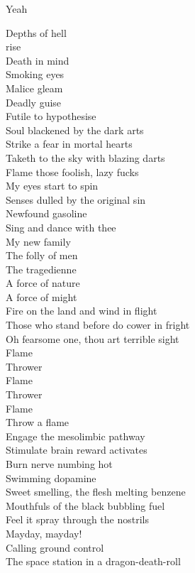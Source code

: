 Yeah\\



Depths of hell\\
 rise\\
Death in mind\\
Smoking eyes\\
Malice gleam\\
Deadly guise\\
Futile to hypothesise\\
Soul blackened by the dark arts\\
Strike a fear in mortal hearts\\
Taketh to the sky with blazing darts\\
Flame those foolish, lazy fucks\\

My eyes start to spin\\
Senses dulled by the original sin\\
Newfound gasoline\\
Sing and dance with thee\\
My new family\\
The folly of men\\
The tragedienne\\
A force of nature\\
A force of might\\
Fire on the land and wind in flight\\
Those who stand before do cower in fright\\
Oh fearsome one, thou art terrible sight\\

Flame\\
Thrower\\
Flame\\
Thrower\\
Flame\\
Throw a flame\\

Engage the mesolimbic pathway\\
Stimulate brain reward activates\\
Burn nerve numbing hot\\
Swimming dopamine\\
Sweet smelling, the flesh melting benzene\\
Mouthfuls of the black bubbling fuel\\
Feel it spray through the  nostrils\\
Mayday, mayday!\\
Calling ground control\\
The space station in a dragon-death-roll\\


